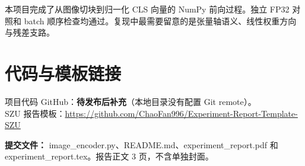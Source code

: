 \documentclass[UTF8,12pt,a4paper]{ctexart}
\begin{document}
本项目完成了从图像切块到归一化 CLS 向量的 NumPy 前向过程。独立 FP32 对照和 batch 顺序检查均通过。复现中最需要留意的是张量轴语义、线性权重方向与残差支路。

\section*{代码与模板链接}
项目代码 GitHub：\textbf{待发布后补充}（本地目录没有配置 Git remote）。\\
SZU 报告模板：\url{https://github.com/ChaoFan996/Experiment-Report-Template-SZU}

\vspace{0.5em}\noindent\textbf{提交文件：} image\_encoder.py、README.md、experiment\_report.pdf 和 experiment\_report.tex。报告正文 3 页，不含单独封面。
\end{document}
